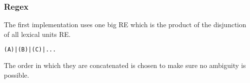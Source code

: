 \subsubsection{Regex}

The first implementation uses one big RE which is the product of the disjunction of all lexical units RE.

\begin{verbatim}
(A)|(B)|(C)|...
\end{verbatim}

The order in which they are concatenated is chosen to make sure no ambiguity is possible.



